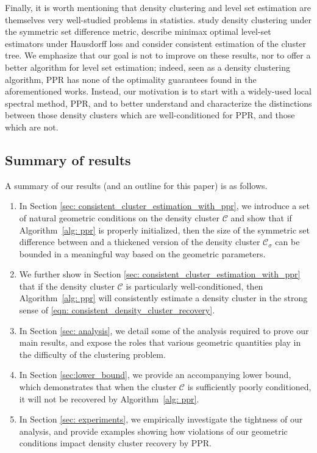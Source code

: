 \documentclass[11pt,twoside]{article}
\theoremstyle{definition}
\newcommand{\1}{\mathbbm{1}}
\newcommand{\Cset}{\mathcal{C}}
\newcommand{\Csig}{\Cset_{\sigma}}
\newcommand{\Cest}{\widehat{C}}
\begin{document}
Finally, it is worth mentioning that density clustering and level set estimation
are themselves very well-studied problems in statistics. \citet{polonik1995,
  rigollet2009} study density clustering under the symmetric set difference
metric, \citet{tsybakov1997,singh2009} describe minimax optimal level-set
estimators under Hausdorff loss and
\citet{hartigan1981,chaudhuri2010,balakrishnan2013,kpotufe11} consider
consistent estimation of the cluster tree. We emphasize that our goal is
not to improve on these results, nor to offer a better algorithm for level set
estimation; indeed, seen as a density clustering algorithm, PPR has none 
of the optimality guarantees found in the aforementioned works. Instead, our
motivation is to start with a widely-used local spectral method, PPR, and to
better understand and characterize the distinctions between those density 
clusters which are well-conditioned for PPR, and those which are not.  

\subsection{Summary of results}

A summary of our results (and an outline for this paper) is as follows. 

\begin{enumerate}
\item In Section \ref{sec: consistent_cluster_estimation_with_ppr}, we introduce 
  a set of natural geometric conditions on the density cluster $\Cset$
  and show that if Algorithm~\ref{alg: ppr} is properly initialized, then the size of
  the symmetric set difference between \smash{$\Cest$} and a thickened version
  of the density cluster $\Csig$ can be bounded in a meaningful way based on the
  geometric parameters. 
	
\item We further show in Section \ref{sec:
    consistent_cluster_estimation_with_ppr} that if the density cluster  
  $\Cset$ is particularly well-conditioned, then Algorithm~\ref{alg: ppr} 
  will consistently estimate a density cluster in the strong sense of
  \eqref{eqn: consistent_density_cluster_recovery}.   
	
\item In Section \ref{sec: analysis}, we detail some of the analysis required to 
  prove our main results, and expose the roles that various geometric quantities 
  play in the difficulty of the clustering problem.  
  
\item In Section \ref{sec:lower_bound}, we provide an accompanying lower bound,
  which demonstrates that when the cluster $\Cset$ is sufficiently poorly
  conditioned, it will not be recovered by Algorithm~\ref{alg: ppr}. 
	
\item In Section \ref{sec: experiments}, we empirically investigate the
  tightness of our analysis, and provide examples showing how violations of our  
  geometric conditions impact density cluster recovery by PPR.
\end{enumerate}
\end{document}
